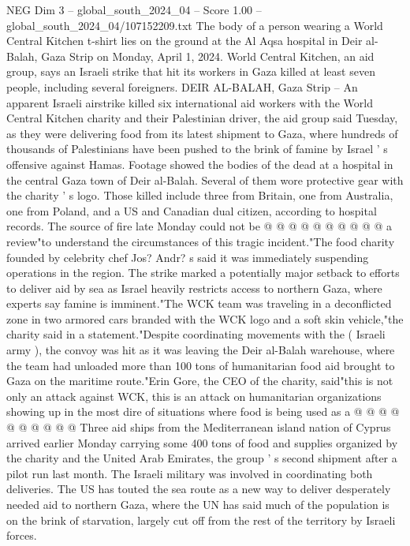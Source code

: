 \begin{textsample}{NEG Dim 3 – global\_south\_2024\_04 – Score 1.00 – global\_south\_2024\_04/107152209.txt}  \label{ex:f3_neg_265}
The body of a person wearing a World Central Kitchen t-shirt lies on the ground at the Al Aqsa hospital in Deir al-Balah, Gaza Strip on Monday, April 1, 2024.
World Central Kitchen, an aid group, says an Israeli strike that hit its workers in Gaza killed at least seven people, including several foreigners.
DEIR AL-BALAH, Gaza Strip -- An apparent Israeli airstrike killed six international aid workers with the World Central Kitchen charity and their Palestinian driver, the aid group said Tuesday, as they were delivering food from its latest shipment to Gaza, where hundreds of thousands of Palestinians have been pushed to the brink of famine by Israel ' s offensive against Hamas.
Footage showed the bodies of the dead at a hospital in the central Gaza town of Deir al-Balah.
Several of them wore protective gear with the charity ' s logo.
Those killed include three from Britain, one from Australia, one from Poland, and a US and Canadian dual citizen, according to hospital records.
The source of fire late Monday could not be @ @ @ @ @ @ @ @ @ @ a review"to understand the circumstances of this tragic incident."The food charity founded by celebrity chef Jos?
Andr? s said it was immediately suspending operations in the region.
The strike marked a potentially major setback to efforts to deliver aid by sea as Israel heavily restricts access to northern Gaza, where experts say famine is imminent."The WCK team was traveling in a deconflicted zone in two armored cars branded with the WCK logo and a soft skin vehicle,"the charity said in a statement."Despite coordinating movements with the ( Israeli army ), the convoy was hit as it was leaving the Deir al-Balah warehouse, where the team had unloaded more than 100 tons of humanitarian food aid brought to Gaza on the maritime route."Erin Gore, the CEO of the charity, said"this is not only an attack against WCK, this is an attack on humanitarian organizations showing up in the most dire of situations where food is being used as a @ @ @ @ @ @ @ @ @ @ Three aid ships from the Mediterranean island nation of Cyprus arrived earlier Monday carrying some 400 tons of food and supplies organized by the charity and the United Arab Emirates, the group ' s second shipment after a pilot run last month.
The Israeli military was involved in coordinating both deliveries.
The US has touted the sea route as a new way to deliver desperately needed aid to northern Gaza, where the UN has said much of the population is on the brink of starvation, largely cut off from the rest of the territory by Israeli forces.

\end{textsample}
